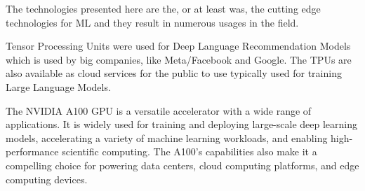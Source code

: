 The technologies presented here are the, or at least was, the cutting edge technologies for ML and
they result in numerous usages in the field. 

Tensor Processing Units were used for Deep Language Recommendation Models which is used by big companies, like Meta/Facebook and Google. \cite{b9}
The TPUs are also available as cloud services for the public to use typically used for training Large Language Models.

The NVIDIA A100 GPU is a versatile accelerator with a wide range of applications. It is widely used for training and deploying large-scale deep learning models, accelerating a variety of machine learning workloads, and enabling high-performance scientific computing. The A100's capabilities also
 make it a compelling choice for powering data centers, cloud computing platforms, and edge computing devices.